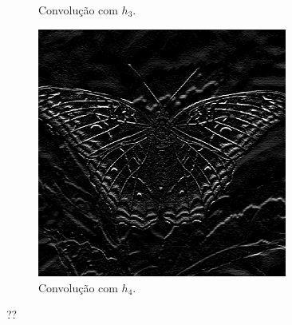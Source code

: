\begin{figure}[H]
\begin{subfigure}{0.48\textwidth}
        \caption{Convolução com $h_3$.}
    \end{subfigure}%
    \begin{subfigure}{0.48\textwidth}
        \centering
        \includegraphics[width=0.9\textwidth]{resultados/butterfly_h4.png}
        \caption{Convolução com $h_4$.}
    \end{subfigure}

    \caption{??}
\end{figure}
